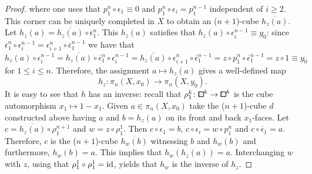 \begin{proof}
where one uses that $p_1^n\circ\epsilon_1 \equiv 0$ and $p_1^n\circ\epsilon_i = p_1^{n-1}$ independent of $i\geq 2$.
This corner can be uniquely completed in $X$ to obtain an ($n+1$)-cube $\overline{h_z(a)}$.
Let $h_z(a) = \overline{h_z(a)}\circ\overline{\epsilon}_1^n$.
This $h_z(a)$ satisfies that $h_z(a)\circ\epsilon_i^{n-1} \equiv y_0$:
since $\overline{\epsilon}_1^n\circ\epsilon_i^{n-1} = \epsilon_{i+1}^n\circ\overline{\epsilon}_1^{n-1}$
we have that
\[
    h_z(a)\circ\epsilon_i^{n-1}
    = \overline{h_z(a)}\circ\overline{\epsilon}_1^n\circ\epsilon_i^{n-1}
    = \overline{h_z(a)}\circ\epsilon_{i+1}^n\circ\overline{\epsilon}_1^{n-1}
    = z\circ p_1^n\circ\overline{\epsilon}_1^{n-1}
    = z\circ 1
    \equiv y_0
\]
for $1\leq i\leq n$.
Therefore, the assignment $a\mapsto h_z(a)$ gives a well-defined map
\[
    h_z\colon\pi_n(X,x_0)\to\pi_n(X,y_0).
\]
It is easy to see that $h$ has an inverse:
recall that $\rho_1^k\colon{\bbox}^k\to{\bbox}^k$ is the cube automorphism $x_1\mapsto 1-x_1$.
Given $a\in\pi_n(X,x_0)$ take the ($n+1$)-cube $d$ constructed above having $a$ and $b = h_z(a)$
on its front and back $x_1$-faces.
Let $c = \overline{h_z(a)}\circ\rho_1^{n+1}$ and $w = z\circ\rho_1^1$.
Then $c\circ\epsilon_1 = b$, $c\circ\epsilon_i = w\circ p_1^n$ and $c\circ\overline{\epsilon}_1 = a$.
Therefore, $c$ is the ($n+1$)-cube $\overline{h_w(b)}$ witnessing $b$ and $h_w(b)$ and furthermore, $h_w(b) = a$.
This implies that $h_w(h_z(a)) = a$.
Interchanging $w$ with $z$, using that $\rho_1^1\circ\rho_1^1 = \operatorname{id}$, yields that $h_w$ is the inverse of $h_z$.


\end{proof}
